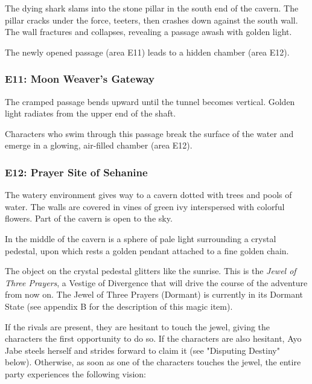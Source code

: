 \documentclass[10pt,a4paper,twoside,bg=print,twocolumn,openany,nodeprecatedcode]{dndbook}
\begin{document}
\begin{DndReadAloud}{}
The dying shark slams into the stone pillar in the south end of the cavern. The pillar cracks under the force, teeters, then crashes down against the south wall. The wall fractures and collapses, revealing a passage awash with golden light.

\end{DndReadAloud}

The newly opened passage (area E11) leads to a hidden chamber (area E12).

\subsubsection{E11: Moon Weaver's Gateway}
\begin{DndReadAloud}{}
The cramped passage bends upward until the tunnel becomes vertical. Golden light radiates from the upper end of the shaft.

\end{DndReadAloud}

Characters who swim through this passage break the surface of the water and emerge in a glowing, air-filled chamber (area E12).

\subsubsection{E12: Prayer Site of Sehanine}
\begin{DndReadAloud}{}
The watery environment gives way to a cavern dotted with trees and pools of water. The walls are covered in vines of green ivy interspersed with colorful flowers. Part of the cavern is open to the sky.

In the middle of the cavern is a sphere of pale light surrounding a crystal pedestal, upon which rests a golden pendant attached to a fine golden chain.

\end{DndReadAloud}

The object on the crystal pedestal glitters like the sunrise. This is the \textit{Jewel of Three Prayers}, a Vestige of Divergence that will drive the course of the adventure from now on. The Jewel of Three Prayers (Dormant) is currently in its Dormant State (see appendix B for the description of this magic item).

If the rivals are present, they are hesitant to touch the jewel, giving the characters the first opportunity to do so. If the characters are also hesitant, Ayo Jabe steels herself and strides forward to claim it (see "Disputing Destiny" below). Otherwise, as soon as one of the characters touches the jewel, the entire party experiences the following vision:
\end{document}
